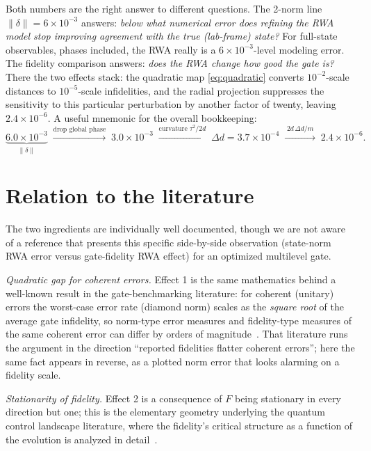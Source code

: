 \documentclass[11pt]{article}
\newcommand{\norm}[1]{\lVert #1 \rVert}
\begin{document}
Both numbers are the right answer to different questions.  The 2-norm line
$\norm{\delta} = 6\times10^{-3}$ answers: \emph{below what numerical error does
refining the RWA model stop improving agreement with the true (lab-frame)
state?}  For full-state observables, phases included, the RWA really is a
$6\times10^{-3}$-level modeling error.  The fidelity comparison answers:
\emph{does the RWA change how good the gate is?}  There the two effects stack:
the quadratic map \eqref{eq:quadratic} converts $10^{-2}$-scale distances to
$10^{-5}$-scale infidelities, and the radial projection suppresses the
sensitivity to this particular perturbation by another factor of twenty,
leaving $2.4\times10^{-6}$.  A useful mnemonic for the overall bookkeeping:
\begin{equation}
    \underbrace{6.0\times10^{-3}}_{\norm{\delta}}
    \;\xrightarrow{\text{drop global phase}}\;
    3.0\times10^{-3}
    \;\xrightarrow{\text{curvature } \tau^2/2d}\;
    \Delta d = 3.7\times10^{-4}
    \;\xrightarrow{\;2d\,\Delta d/m\;}\;
    2.4\times10^{-6}.
\end{equation}

\section{Relation to the literature}

The two ingredients are individually well documented, though we are not aware
of a reference that presents this specific side-by-side observation (state-norm
RWA error versus gate-fidelity RWA effect) for an optimized multilevel gate.

\emph{Quadratic gap for coherent errors.}  Effect 1 is the same mathematics
behind a well-known result in the gate-benchmarking literature: for coherent
(unitary) errors the worst-case error rate (diamond norm) scales as the
\emph{square root} of the average gate infidelity, so norm-type error measures
and fidelity-type measures of the same coherent error can differ by orders of
magnitude~\cite{Sanders2016, Kueng2016, Wallman2016}.  That literature runs the
argument in the direction ``reported fidelities flatter coherent errors'';
here the same fact appears in reverse, as a plotted norm error that looks
alarming on a fidelity scale.

\emph{Stationarity of fidelity.}  Effect 2 is a consequence of $F$ being
stationary in every direction but one; this is the elementary geometry
underlying the quantum control landscape literature, where the fidelity's
critical structure as a function of the evolution is analyzed in
detail~\cite{Rabitz2004}.
\end{document}
